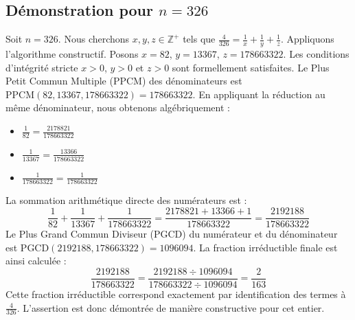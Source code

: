 \documentclass[11pt,a4paper]{article}
\begin{document}
\subsection{Démonstration pour $n = 326$}
Soit $n = 326$. Nous cherchons $x, y, z \in \mathbb{Z}^{+}$ tels que $\frac{4}{326} = \frac{1}{x} + \frac{1}{y} + \frac{1}{z}$.
Appliquons l'algorithme constructif. Posons $x = 82$, $y = 13367$, $z = 178663322$.
Les conditions d'intégrité stricte $x > 0$, $y > 0$ et $z > 0$ sont formellement satisfaites.
Le Plus Petit Commun Multiple (PPCM) des dénominateurs est $\text{PPCM}(82, 13367, 178663322) = 178663322$.
En appliquant la réduction au même dénominateur, nous obtenons algébriquement :
\begin{itemize}
    \item $\frac{1}{82} = \frac{2178821}{178663322}$
    \item $\frac{1}{13367} = \frac{13366}{178663322}$
    \item $\frac{1}{178663322} = \frac{1}{178663322}$
\end{itemize}
La sommation arithmétique directe des numérateurs est :
$$ \frac{1}{82} + \frac{1}{13367} + \frac{1}{178663322} = \frac{2178821 + 13366 + 1}{178663322} = \frac{2192188}{178663322} $$
Le Plus Grand Commun Diviseur (PGCD) du numérateur et du dénominateur est $\text{PGCD}(2192188, 178663322) = 1096094$.
La fraction irréductible finale est ainsi calculée :
$$ \frac{2192188}{178663322} = \frac{2192188 \div 1096094}{178663322 \div 1096094} = \frac{2}{163} $$
Cette fraction irréductible correspond exactement par identification des termes à $\frac{4}{326}$. L'assertion est donc démontrée de manière constructive pour cet entier.
\end{document}
